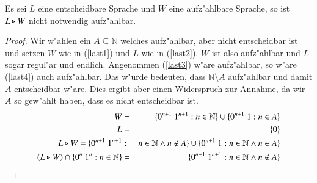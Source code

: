 \begin{satz}
Es sei $L$ eine entscheidbare Sprache und $W$ eine aufz"ahlbare Sprache, so ist $L\triangleright W$ nicht notwendig aufz"ahlbar.
\end{satz}
\begin{proof}
Wir w"ahlen ein $A\subseteq \mathbb{N}$ welches aufz"ahlbar, aber nicht entscheidbar ist und
setzen $W$ wie in (\ref{last1}) und $L$ wie in (\ref{last2}). $W$ ist also aufz"ahlbar und $L$ sogar regul"ar und endlich.
Angenommen (\ref{last3}) w"are aufz"ahlbar, so w"are (\ref{last4}) auch aufz"ahlbar. Das w"urde bedeuten, dass $\mathbb{N}\setminus A$ aufz"ahlbar und damit $A$ entscheidbar w"are. Dies ergibt aber einen Widerspruch zur Annahme, da wir $A$ so gew"ahlt haben, dass es nicht entscheidbar ist.
\setcounter{equation}{0}
\begin{eqnarray}
W&=&\{0^{n+1}\ 1^{n+1} : n\in \mathbb{N} \} \cup \{0^{n+1}\ 1 : n\in A \} \label{last1} \\
L&=&\{0\} \label{last2} \\
L\ff W = \{0^{n+1}\ 1^{n+1} &:& n\in\mathbb{N} \wedge n\notin A\} \cup \{0^{n+1}\ 1:n\in \mathbb{N} \wedge n\in A\} \label{last3} \\
(L\ff W)\cap \{0^n\ 1^n : n\in \mathbb{N}\} &=& \{0^{n+1}\ 1^{n+1} : n\in \mathbb{N} \wedge n\notin A\} \label{last4} 
\end{eqnarray}
\end{proof}

